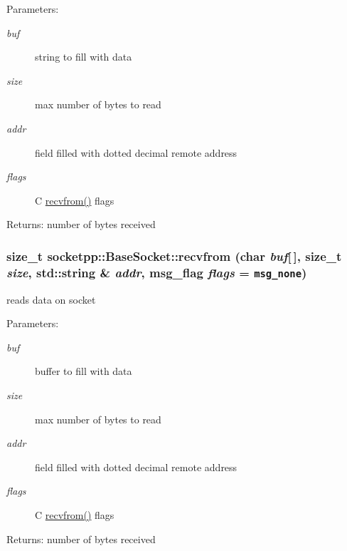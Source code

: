 \begin{CompactItemize}
\begin{Desc}
\item[Parameters:]
\begin{description}
\item[{\em buf}]string to fill with data \item[{\em size}]max number of bytes to read \item[{\em addr}]field filled with dotted decimal remote address \item[{\em flags}]C \hyperlink{classsocketpp_1_1BaseSocket_6a207860c0a1328dc05bea32bb62e81f}{recvfrom()} flags \end{description}
\end{Desc}
\begin{Desc}
\item[Returns:]number of bytes received \end{Desc}
\hypertarget{classsocketpp_1_1BaseSocket_5ee0ad55fa03ca79a879e1d73670ede9}{
\subsubsection[{recvfrom}]{\setlength{\rightskip}{0pt plus 5cm}size\_\-t socketpp::BaseSocket::recvfrom (char {\em buf}\mbox{[}$\,$\mbox{]}, \/  size\_\-t {\em size}, \/  std::string \& {\em addr}, \/  msg\_\-flag {\em flags} = {\tt msg\_\-none})}}
\label{classsocketpp_1_1BaseSocket_5ee0ad55fa03ca79a879e1d73670ede9}


reads data on socket 

\begin{Desc}
\item[Parameters:]
\begin{description}
\item[{\em buf}]buffer to fill with data \item[{\em size}]max number of bytes to read \item[{\em addr}]field filled with dotted decimal remote address \item[{\em flags}]C \hyperlink{classsocketpp_1_1BaseSocket_6a207860c0a1328dc05bea32bb62e81f}{recvfrom()} flags \end{description}
\end{Desc}
\begin{Desc}
\item[Returns:]number of bytes received \end{Desc}
\hypertarget{classsocketpp_1_1BaseSocket_723f0c1b9325ef3be7c97f520e6bc775}{
}
\end{CompactItemize}
